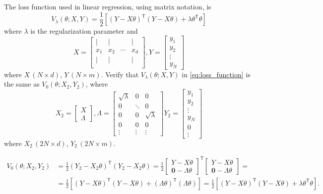 \documentclass[]{article}
\begin{document}
The loss function used in linear regression, using matrix notation, is
\begin{equation}
	\label{eq:loss_function}
	V_\lambda(\theta; X,Y) = \frac{1}{2}[(Y-X\theta)^\mathsf{T} (Y-X\theta) + \lambda\theta^\mathsf{T}\theta]
\end{equation}
where $\lambda$ is the regularization parameter and 
\begin{equation}
	X = \begin{bmatrix}
	| & | &  & | \\
	x_1 & x_2 & \cdots & x_d\\
	| & | &  & |\\
	\end{bmatrix},
	Y = \begin{bmatrix}
	y_1 \\
	y_2 \\
	\vdots \\
	y_N
	\end{bmatrix}
\end{equation}
where $X \, (N \times d)$, $Y\, (N \times m)$.
Verify that $V_\lambda(\theta; X, Y)$ in \eqref{eq:loss_function} is the same as $V_0(\theta; X_2, Y_2)$, where
\begin{equation}
	X_2  = \begin{bmatrix}
	X\\
	\Lambda
	\end{bmatrix},
	\Lambda = \begin{bmatrix}
	\sqrt{\lambda} & 0 & 0 \\
	0 & \ddots & 0 \\
	0 & 0 & \sqrt{\lambda} \\
	0 & 0 & 0 \\
	\vdots & \vdots & \vdots
	\end{bmatrix}
	Y_2 = \begin{bmatrix}
	y_1 \\
	y_2 \\
	\vdots \\
	y_N \\
	0\\
	\vdots
	\end{bmatrix}
\end{equation}
where $X_2 \, (2N \times d)$, $Y_2\, (2N \times m)$.

\begin{align}
V_0(\theta; X_2, Y_2) &=\frac{1}{2}(Y_2-X_2\theta)^\mathsf{T} (Y_2-X_2\theta)  = \frac{1}{2}\begin{bmatrix}
Y-X\theta\\
\mathbf{0}-\Lambda\theta
\end{bmatrix}^\mathsf{T}
\begin{bmatrix}
Y-X\theta\\
\mathbf{0}-\Lambda\theta
\end{bmatrix} = \\
&= \frac{1}{2}[(Y-X\theta)^\mathsf{T}(Y-X\theta) + (\Lambda\theta)^\mathsf{T}(\Lambda\theta)] = \frac{1}{2}[(Y-X\theta)^\mathsf{T} (Y-X\theta) + \lambda\theta^\mathsf{T}\theta].
\end{align}
\end{document}
